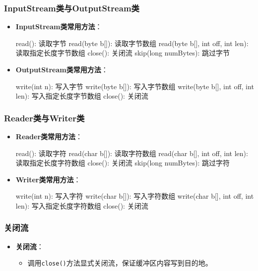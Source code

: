 \documentclass[a4paper, 10pt]{ctexart}
\begin{document}
\subsubsection{InputStream类与OutputStream类}
\begin{itemize}
  \item \textbf{InputStream类常用方法}：
  \begin{codeblock}
read(): 读取字节
read(byte b[]): 读取字节数组
read(byte b[], int off, int len): 读取指定长度字节数组
close(): 关闭流
skip(long numBytes): 跳过字节
  \end{codeblock}
  \item \textbf{OutputStream类常用方法}：
  \begin{codeblock}
write(int n): 写入字节
write(byte b[]): 写入字节数组
write(byte b[], int off, int len): 写入指定长度字节数组
close(): 关闭流
  \end{codeblock}
\end{itemize}

\subsubsection{Reader类与Writer类}
\begin{itemize}
  \item \textbf{Reader类常用方法}：
  \begin{codeblock}
read(): 读取字符
read(char b[]): 读取字符数组
read(char b[], int off, int len): 读取指定长度字符数组
close(): 关闭流
skip(long numBytes): 跳过字符
  \end{codeblock}
  \item \textbf{Writer类常用方法}：
  \begin{codeblock}
write(int n): 写入字符
write(char b[]): 写入字符数组
write(char b[], int off, int len): 写入指定长度字符数组
close(): 关闭流
  \end{codeblock}
\end{itemize}

\subsubsection{关闭流}
\begin{itemize}
  \item \textbf{关闭流}：
  \begin{itemize}
    \item 调用\texttt{close()}方法显式关闭流，保证缓冲区内容写到目的地。
  \end{itemize}
\end{itemize}
\end{document}
